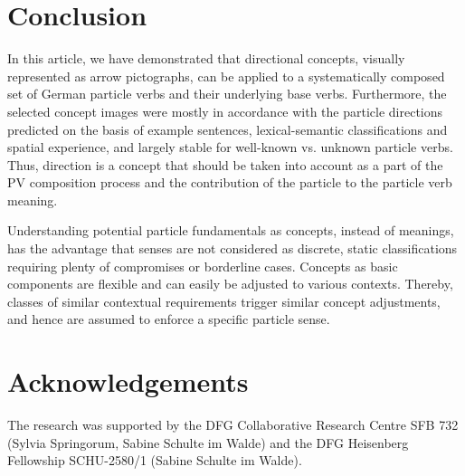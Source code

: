 \documentclass[output=paper]{langsci/langscibook}
\begin{document}
\section{Conclusion}

In this article, we have demonstrated that directional concepts, visually
represented as arrow pictographs, can be applied to a systematically
composed set of German particle verbs and their underlying base
verbs. Furthermore, the selected concept images were mostly in
accordance with the particle directions predicted on the basis of
example sentences, lexical-semantic classifications and spatial
experience, and largely stable for well-known vs. unknown particle
verbs. Thus, direction is a concept that should be taken into account
as a part of the PV composition process and the contribution of the
particle to the particle verb meaning.

Understanding potential particle fundamentals as concepts, instead of
meanings, has the advantage that senses are not considered as
discrete, static classifications requiring plenty of compromises or
borderline cases. Concepts as basic components are flexible and can
easily be adjusted to various contexts. Thereby, classes of similar
contextual requirements trigger similar concept adjustments, and hence
are assumed to enforce a specific particle sense.


%
%
%
%


\section*{Acknowledgements}

The research was supported by the DFG Collaborative Research Centre
SFB 732 (Sylvia Springorum, Sabine Schulte im Walde) and the DFG
Heisenberg Fellowship SCHU-2580/1 (Sabine Schulte im Walde).
\end{document}
